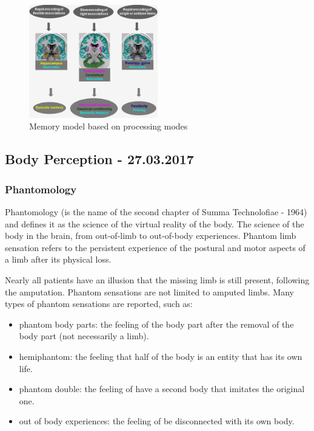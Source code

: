 \documentclass[12pt,article,oneside,a4paper]{memoir}
\begin{document}
\begin{figure}[h]
  \centering
  \includegraphics[width=0.5\textwidth]{imgs/new-memory-model.png}
  \caption{Memory model based on processing modes}
  \label{fig:new-memory-model}
\end{figure}


\newpage
\subsection{Body Perception - 27.03.2017}
\subsubsection{Phantomology}
Phantomology (is the name of the second chapter of Summa Technolofiae - 1964)
and defines it as the science of the virtual reality of the body.
The science of the body in the brain, from out-of-limb to out-of-body experiences. 
Phantom  limb  sensation refers to the persistent experience of the postural and
motor aspects of a limb after its physical loss.

Nearly all patients have an illusion that the missing limb is still present,
following the amputation.
Phantom sensations are not limited to amputed limbs. Many types of phantom
sensations are reported, such as:
\begin{itemize}
\item phantom body parts: the feeling of the body part after the removal of the
body part (not necessarily a limb).
\item hemiphantom: the feeling that half of the body is an entity that has its
own life.
\item phantom double: the feeling of have a second body that imitates the
original one.
\item out of body experiences: the feeling of be disconnected with its own body.
\end{itemize}
\end{document}
